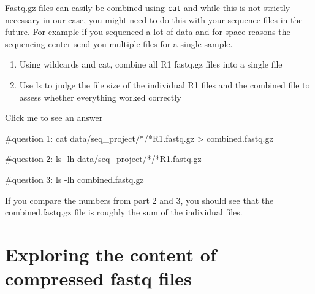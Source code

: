 \documentclass[
  letterpaper,
  DIV=11,
  numbers=noendperiod]{scrreprt}
\newenvironment{Shaded}{}{}
\newcommand{\AttributeTok}[1]{\textcolor[rgb]{0.84,0.23,0.29}{#1}}
\newcommand{\CommentTok}[1]{\textcolor[rgb]{0.42,0.45,0.49}{#1}}
\newcommand{\FunctionTok}[1]{\textcolor[rgb]{0.44,0.26,0.76}{#1}}
\newcommand{\NormalTok}[1]{\textcolor[rgb]{0.14,0.16,0.18}{#1}}
\newcommand{\OperatorTok}[1]{\textcolor[rgb]{0.14,0.16,0.18}{#1}}
\newcommand{\PreprocessorTok}[1]{\textcolor[rgb]{0.84,0.23,0.29}{#1}}
\providecommand{\tightlist}{%
  \setlength{\itemsep}{0pt}\setlength{\parskip}{0pt}}\usepackage{longtable,booktabs,array}
\begin{document}
\begin{tcolorbox}[enhanced jigsaw, rightrule=.15mm, colbacktitle=quarto-callout-caution-color!10!white, colframe=quarto-callout-caution-color-frame, colback=white, arc=.35mm, opacitybacktitle=0.6, coltitle=black, bottomtitle=1mm, breakable, bottomrule=.15mm, leftrule=.75mm, titlerule=0mm, title=\textcolor{quarto-callout-caution-color}{\faFire}\hspace{0.5em}{Exercise}, toprule=.15mm, toptitle=1mm, opacityback=0, left=2mm]

Fastq.gz files can easily be combined using \texttt{cat} and while this
is not strictly necessary in our case, you might need to do this with
your sequence files in the future. For example if you sequenced a lot of
data and for space reasons the sequencing center send you multiple files
for a single sample.

\begin{enumerate}
\def\labelenumi{\arabic{enumi}.}
\tightlist
\item
  Using wildcards and cat, combine all R1 fastq.gz files into a single
  file
\item
  Use ls to judge the file size of the individual R1 files and the
  combined file to assess whether everything worked correctly
\end{enumerate}

Click me to see an answer

\begin{Shaded}
\begin{Highlighting}[]
\CommentTok{\#question 1:}
\FunctionTok{cat}\NormalTok{ data/seq\_project/}\PreprocessorTok{*}\NormalTok{/}\PreprocessorTok{*}\NormalTok{R1.fastq.gz }\OperatorTok{\textgreater{}}\NormalTok{ combined.fastq.gz}

\CommentTok{\#question 2:}
\FunctionTok{ls} \AttributeTok{{-}lh}\NormalTok{ data/seq\_project/}\PreprocessorTok{*}\NormalTok{/}\PreprocessorTok{*}\NormalTok{R1.fastq.gz}

\CommentTok{\#question 3: }
\FunctionTok{ls} \AttributeTok{{-}lh}\NormalTok{ combined.fastq.gz}
\end{Highlighting}
\end{Shaded}

If you compare the numbers from part 2 and 3, you should see that the
combined.fastq.gz file is roughly the sum of the individual files.

\end{tcolorbox}

\section{Exploring the content of compressed fastq
files}\label{exploring-the-content-of-compressed-fastq-files}
\end{document}
